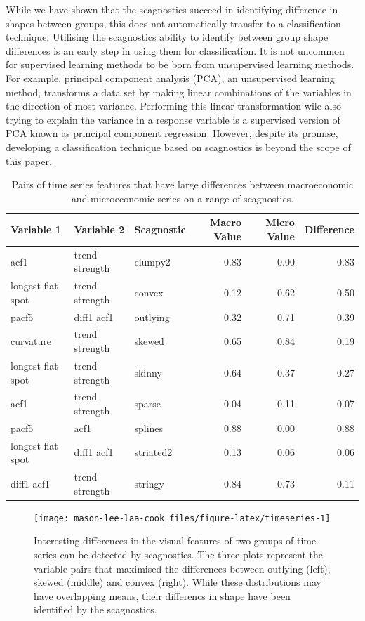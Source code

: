 While we have shown that the scagnostics succeed in identifying difference in shapes between groups, this does not automatically transfer to a classification technique. Utilising the scagnostics ability to identify between group shape differences is an early step in using them for classification. It is not uncommon for supervised learning methods to be born from unsupervised learning methods. For example, principal component analysis (PCA), an unsupervised learning method, transforms a data set by making linear combinations of the variables in the direction of most variance. Performing this linear transformation wile also trying to explain the variance in a response variable is a supervised version of PCA known as principal component regression. However, despite its promise, developing a classification technique based on scagnostics is beyond the scope of this paper.

\begin{table}

\caption{\label{tab:scagsmacmic-pdf}Pairs of time series features that have large differences between macroeconomic and microeconomic series on a range of scagnostics.}
\centering
\begin{tabular}[t]{lllrrr}
\toprule
Variable 1 & Variable 2 & Scagnostic & Macro Value & Micro Value & Difference\\
\midrule
acf1 & trend strength & clumpy2 & 0.83 & 0.00 & 0.83\\
longest flat spot & trend strength & convex & 0.12 & 0.62 & 0.50\\
pacf5 & diff1 acf1 & outlying & 0.32 & 0.71 & 0.39\\
curvature & trend strength & skewed & 0.65 & 0.84 & 0.19\\
longest flat spot & trend strength & skinny & 0.64 & 0.37 & 0.27\\
\addlinespace
acf1 & trend strength & sparse & 0.04 & 0.11 & 0.07\\
pacf5 & acf1 & splines & 0.88 & 0.00 & 0.88\\
longest flat spot & diff1 acf1 & striated2 & 0.13 & 0.06 & 0.06\\
diff1 acf1 & trend strength & stringy & 0.84 & 0.73 & 0.11\\
\bottomrule
\end{tabular}
\end{table}

\begin{figure}
\texttt{[image: mason-lee-laa-cook\_files/figure-latex/timeseries-1]} \caption{Interesting differences in the visual features of two groups of time series can be detected by scagnostics. The three plots represent the variable pairs that maximised the differences between outlying (left), skewed (middle) and convex (right). While these distributions may have overlapping means, their differencs in shape have been identified by the scagnostics.}\label{fig:timeseries}
\end{figure}

